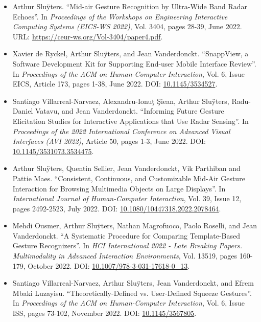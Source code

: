 {\begin{itemize}
    \item Arthur Slu\"{y}ters. ``Mid-air Gesture Recognition by Ultra-Wide Band Radar Echoes''. In \textit{Proceedings of the Workshops on Engineering Interactive Computing Systems (EICS-WS 2022)}, Vol. 3404, pages 28-39, June 2022. URL: \href{https://ceur-ws.org/Vol-3404/paper4.pdf}{https://ceur-ws.org/Vol-3404/paper4.pdf}.
    
    \item Xavier de Ryckel, Arthur Slu\"{y}ters, and Jean Vanderdonckt. ``SnappView, a Software Development Kit for Supporting End-user Mobile Interface Review''. In \textit{Proceedings of the ACM on Human-Computer Interaction}, Vol. 6, Issue EICS, Article 173, pages 1-38, June 2022. DOI: \href{https://doi.org/10.1145/3534527}{10.1145/3534527}.

    \item Santiago Villarreal-Narvaez, Alexandru-Ionuţ Şiean, Arthur Slu\"{y}ters, Radu-Daniel Vatavu, and Jean Vanderdonckt. ``Informing Future Gesture Elicitation Studies for Interactive Applications that Use Radar Sensing''. In \textit{Proceedings of the 2022 International Conference on Advanced Visual Interfaces (AVI 2022)}, Article 50, pages 1-3, June 2022. DOI: \href{https://doi.org/10.1145/3531073.3534475}{10.1145/3531073.3534475}.
    
    \item Arthur Slu\"{y}ters, Quentin Sellier, Jean Vanderdonckt, Vik Parthiban and Pattie Maes. ``Consistent, Continuous, and Customizable Mid-Air Gesture Interaction for Browsing Multimedia Objects on Large Displays''. In \textit{International Journal of Human-Computer Interaction}, Vol. 39, Issue 12, pages 2492-2523, July 2022. DOI: \href{https://doi.org/10.1080/10447318.2022.2078464}{10.1080/10447318.2022.2078464}.
    
    \item Mehdi Ousmer, Arthur Slu\"{y}ters, Nathan Magrofuoco, Paolo Roselli, and Jean Vanderdonckt. ``A Systematic Procedure for Comparing Template-Based Gesture Recognizers''. In \textit{HCI International 2022 - Late Breaking Papers. Multimodality in Advanced Interaction Environments}, Vol. 13519, pages 160-179, October 2022. DOI: \href{https://doi.org/10.1007/978-3-031-17618-0\_13}{10.1007/978-3-031-17618-0\_13}.
    
    \item Santiago Villarreal-Narvaez, Arthur Slu\"{y}ters, Jean Vanderdonckt, and Efrem Mbaki Luzayisu. ``Theoretically-Defined vs. User-Defined Squeeze Gestures''. In \textit{Proceedings of the ACM on Human-Computer Interaction}, Vol. 6, Issue ISS, pages 73-102, November 2022. DOI: \href{https://doi.org/10.1145/3567805}{10.1145/3567805}.


\end{itemize}}
